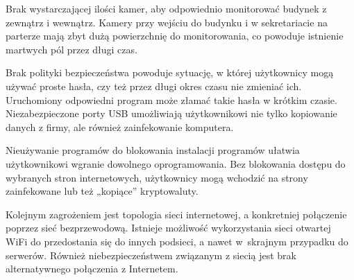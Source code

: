 Brak wystarczającej ilości kamer, aby odpowiednio monitorować budynek z zewnątrz i wewnątrz. Kamery przy wejściu do budynku i w sekretariacie na parterze mają zbyt dużą powierzchnię do monitorowania, co powoduje istnienie martwych pól przez długi czas.  

Brak polityki bezpieczeństwa powoduje sytuację, w której użytkownicy mogą używać proste hasła, czy też przez długi okres czasu nie zmieniać ich. Uruchomiony odpowiedni program może złamać takie hasła w krótkim czasie. 
Niezabezpieczone porty USB umożliwiają użytkownikowi nie tylko kopiowanie danych z firmy, ale również zainfekowanie komputera.  

Nieużywanie programów do blokowania instalacji programów ułatwia użytkownikowi wgranie dowolnego oprogramowania. Bez blokowania  dostępu do wybranych stron internetowych, użytkownicy mogą wchodzić na strony zainfekowane lub też „kopiące” kryptowaluty.

Kolejnym zagrożeniem jest topologia sieci internetowej, a konkretniej połączenie poprzez sieć bezprzewodową. Istnieje możliwość wykorzystania sieci otwartej WiFi do przedostania się do innych podsieci, a nawet \linebreak w~skrajnym przypadku do serwerów. Również niebezpieczeństwem \linebreak związanym z siecią jest brak alternatywnego połączenia z Internetem.



